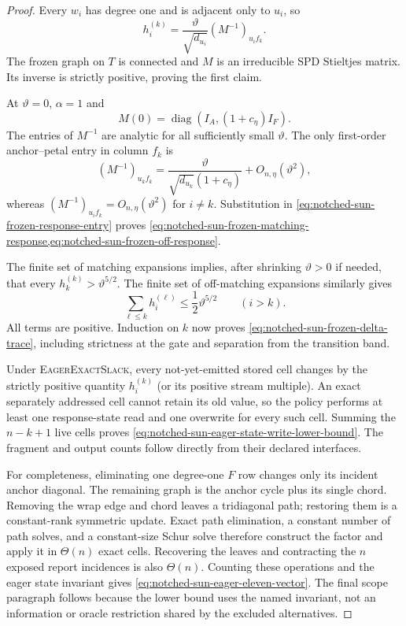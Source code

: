\begin{proof}
Every $w_i$ has degree one and is adjacent only to $u_i$, so
\begin{equation}
 h_i^{(k)}
 =\frac{\vartheta}{\sqrt{d_{u_i}}}
   (M^{-1})_{u_i f_k}.
 \label{eq:notched-sun-frozen-response-entry}
\end{equation}
The frozen graph on $T$ is connected and $M$ is an irreducible SPD Stieltjes
matrix.  Its inverse is strictly positive, proving the first claim.

At $\vartheta=0$, $\alpha=1$ and
\begin{equation*}
 M(0)=\operatorname{diag}(I_A,(1+c_\eta)I_F).
\end{equation*}
The entries of $M^{-1}$ are analytic for all sufficiently small
$\vartheta$.  The only first-order anchor--petal entry in column $f_k$ is
\begin{equation*}
 (M^{-1})_{u_k f_k}
 =\frac{\vartheta}{\sqrt{d_{u_k}}(1+c_\eta)}
  +O_{n,\eta}(\vartheta^2),
\end{equation*}
whereas $(M^{-1})_{u_i f_k}=O_{n,\eta}(\vartheta^2)$ for $i\neq k$.
Substitution in \cref{eq:notched-sun-frozen-response-entry} proves
\cref{eq:notched-sun-frozen-matching-response,eq:notched-sun-frozen-off-response}.

The finite set of matching expansions implies, after shrinking
$\vartheta>0$ if needed, that every $h_k^{(k)}>\vartheta^{5/2}$.  The finite
set of off-matching expansions similarly gives
\begin{equation*}
 \sum_{\ell\leq k}h_i^{(\ell)}
 \leq\frac12\vartheta^{5/2}
 \qquad(i>k).
\end{equation*}
All terms are positive.  Induction on $k$ now proves
\cref{eq:notched-sun-frozen-delta-trace}, including strictness at the gate
and separation from the transition band.

Under \textsc{EagerExactSlack}, every not-yet-emitted stored cell changes by
the strictly positive quantity $h_i^{(k)}$ (or its positive stream multiple).
An exact separately addressed cell cannot retain its old value, so the policy
performs at least one response-state read and one overwrite for every such
cell.  Summing the $n-k+1$ live cells proves
\cref{eq:notched-sun-eager-state-write-lower-bound}.  The fragment and output
counts follow directly from their declared interfaces.

For completeness, eliminating one degree-one $F$ row changes only its
incident anchor diagonal.  The remaining graph is the anchor cycle plus its
single chord.  Removing the wrap edge and chord leaves a tridiagonal path;
restoring them is a constant-rank symmetric update.  Exact path elimination,
a constant number of path solves, and a constant-size Schur solve therefore
construct the factor and apply it in $\Theta(n)$ exact cells.  Recovering the
leaves and contracting the $n$ exposed report incidences is also
$\Theta(n)$.  Counting these operations and the eager state invariant gives
\cref{eq:notched-sun-eager-eleven-vector}.  The final scope paragraph follows
because the lower bound uses the named invariant, not an information or
oracle restriction shared by the excluded alternatives.
\end{proof}

